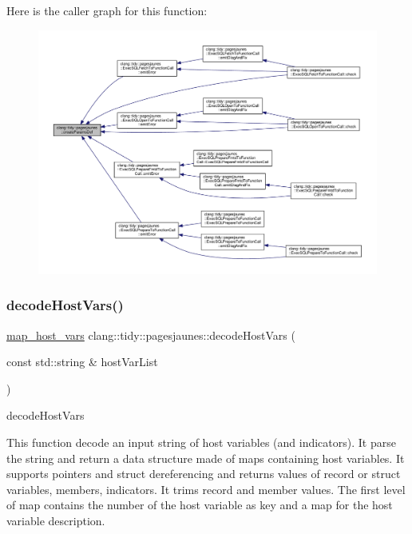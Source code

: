 Here is the caller graph for this function\+:
\nopagebreak
\begin{figure}[H]
\begin{center}
\leavevmode
\includegraphics[width=350pt]{namespaceclang_1_1tidy_1_1pagesjaunes_a1701f2f2432329ae3bb191dec9a9fa25_icgraph}
\end{center}
\end{figure}
\mbox{\label{namespaceclang_1_1tidy_1_1pagesjaunes_a3ebb843a3b48b63600a608b7953b7a90}} 
\subsubsection{\texorpdfstring{decode\+Host\+Vars()}{decodeHostVars()}}
{\footnotesize\ttfamily \hyperlink{_exec_s_q_l_common_8h_a981798828f60d3148ce03aefeba8b71e}{map\+\_\+host\+\_\+vars} clang\+::tidy\+::pagesjaunes\+::decode\+Host\+Vars (\begin{DoxyParamCaption}\item[{const std\+::string \&}]{host\+Var\+List }\end{DoxyParamCaption})}

decode\+Host\+Vars

This function decode an input string of host variables (and indicators). It parse the string and return a data structure made of maps containing host variables. It supports pointers and struct dereferencing and returns values of record or struct variables, members, indicators. It trims record and member values. The first level of map contains the number of the host variable as key and a map for the host variable description.

